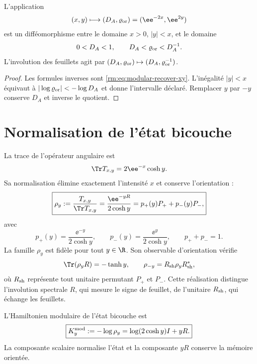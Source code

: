 \begin{proposition}
\label{rm:prop:modular-separation}
L’application
\[
 (x,y)\longmapsto(D_A,\varrho_{\rm or})
 =(\ee^{-2x},\ee^{2y})
\]
est un difféomorphisme entre le domaine \(x>0\), \(|y|<x\), et le domaine
\[
 0<D_A<1,
 \qquad
 D_A<\varrho_{\rm or}<D_A^{-1}.
\]
L’involution des feuillets agit par \(
(D_A,\varrho_{\rm or})\mapsto(D_A,\varrho_{\rm or}^{-1})
\).
\end{proposition}

\begin{proof}
Les formules inverses sont \cref{rm:eq:modular-recover-xy}. L’inégalité \(|y|<x\) équivaut à \(|\log\varrho_{\rm or}|<-\log D_A\) et donne l’intervalle déclaré. Remplacer \(y\) par \(-y\) conserve \(D_A\) et inverse le quotient.
\end{proof}

\section{Normalisation de l’état bicouche}

La trace de l’opérateur angulaire est
\begin{equation}
 \Tr T_{x,y}=2\ee^{-x}\cosh y.
 \label{rm:eq:modular-trace-T}
\end{equation}
Sa normalisation élimine exactement l’intensité \(x\) et conserve l’orientation :
\begin{equation}
 \boxed{
 \rho_y:=\frac{T_{x,y}}{\Tr T_{x,y}}
 =\frac{\ee^{-yR}}{2\cosh y}
 =p_+(y)P_++p_-(y)P_- ,}
 \label{rm:eq:modular-rho}
\end{equation}
avec
\begin{equation}
 p_+(y)=\frac{\ee^{-y}}{2\cosh y},
 \qquad
 p_-(y)=\frac{\ee^{y}}{2\cosh y},
 \qquad
 p_++p_-=1.
 \label{rm:eq:modular-probabilities}
\end{equation}
La famille \(\rho_y\) est fidèle pour tout \(y\in\R\). Son observable d’orientation vérifie
\begin{equation}
 \Tr(\rho_yR)=-\tanh y,
 \qquad
 \rho_{-y}=R_{\rm sh}\rho_yR_{\rm sh}^*,
 \label{rm:eq:modular-orientation-expectation}
\end{equation}
où \(R_{\rm sh}\) représente tout unitaire permutant \(P_+\) et \(P_-\). Cette réalisation distingue l’involution spectrale \(R\), qui mesure le signe de feuillet, de l’unitaire \(R_{\rm sh}\), qui échange les feuillets.

\begin{definition}
\label{rm:def:holographic-modular-hamiltonian} L’Hamiltonien modulaire de l’état bicouche est
\begin{equation}
 \boxed{
 K_y^{\rm mod}:=-\log\rho_y
 =\log(2\cosh y)I+yR.}
 \label{rm:eq:modular-Hamiltonian}
\end{equation}
La composante scalaire normalise l’état et la composante \(yR\) conserve la mémoire orientée.
\end{definition}

